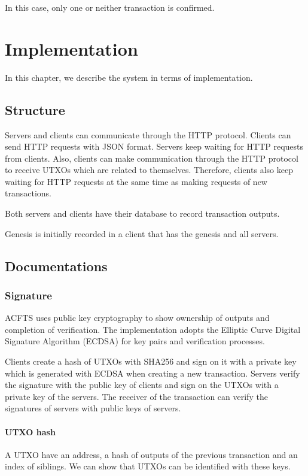 \documentclass[a4paper, oneside]{discothesis}
\begin{document}
In this case, only one or neither transaction is confirmed.


\chapter{Implementation}
In this chapter, we describe the system in terms of implementation.

\section{Structure}
Servers and clients can communicate through the HTTP protocol.
Clients can send HTTP requests with JSON format.
Servers keep waiting for HTTP requests from clients.
Also, clients can make communication through the HTTP protocol
to receive UTXOs which are related to themselves.
Therefore, clients also keep waiting for HTTP requests at the same time
as making requests of new transactions.

Both servers and clients have their database to record transaction outputs.

Genesis is initially recorded in a client that has the genesis and all servers.

\section{Documentations}

\subsection{Signature}
ACFTS uses public key cryptography to show ownership of outputs and completion of verification.
The implementation adopts the Elliptic Curve Digital Signature Algorithm (ECDSA)
for key pairs and verification processes.

Clients create a hash of UTXOs with SHA256 and sign on it with a private key
which is generated with ECDSA when creating a new transaction.
Servers verify the signature with the public key of clients and sign on the UTXOs
with a private key of the servers.
The receiver of the transaction can verify the signatures of servers with public keys
of servers.

\subsubsection{UTXO hash}
A UTXO have an address, a hash of outputs of the previous transaction and an index of siblings.
We can show that UTXOs can be identified with these keys.
\end{document}
